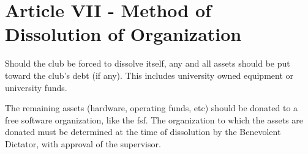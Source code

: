 \documentclass{article}
\begin{document}
	\section{Article VII - Method of Dissolution of Organization}

	Should the club be forced to dissolve itself, any and all assets should be
	put toward the club's debt (if any). This includes university owned
	equipment or university funds.

	The remaining assets (hardware, operating funds, etc) should be donated to
	a free software organization, like the fsf. The organization to which the
	assets are donated must be determined at the time of dissolution by the
	Benevolent Dictator, with approval of the supervisor.
\end{document}
